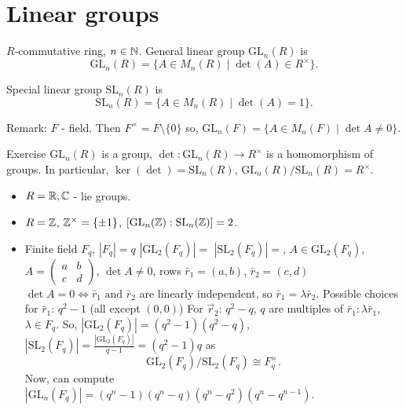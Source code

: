 \documentclass[10pt, a4paper]{article}
\begin{document}
\newpage

\section{Linear groups}

\begin{definition}
    $R$-commutative ring,
    $n \in \mathbb{N}$.
    General linear group $\mathrm{GL}_n(R)$ is
    \[
    \mathrm{GL}_n(R) = \{A \in M_n(R) \mid \det(A) \in R ^ {\times}\}.
    \]
\end{definition}

Special linear group $\mathrm{SL}_n(R)$ is
\[
\mathrm{SL}_n(R) = \{A \in M_n(R) \mid \det(A) = 1\}.
\]

Remark:
$F$ -
field.
Then $F ^ {\times} = F \setminus \{0\}$ so,
$\mathrm{GL}_n(F) = \{A \in M_n(F) \mid \det{A} \neq 0\}$.

Exercise $\mathrm{GL}_n(R)$ is a group,
$\det : \mathrm{GL}_n(R) \to R ^ {\times}$ is a homomorphism of groups.
In particular,
$\ker(\det) = \mathrm{SL}_n(R)$,
$\mathrm{GL}_n(R) / \mathrm{SL}_n(R) = R ^ {\times}$.

\begin{example}\phantom{}
    \begin{itemize}
        \item $R = \mathbb{R}, \mathbb{C}$ -
        lie groups.

        \item $R = \mathbb{Z}$,
        $\mathbb{Z} ^ {\times} = \{\pm 1\}$,
        $[\mathrm{GL}_n(\mathbb{Z}) : \mathrm{SL}_n(\mathbb{Z})] = 2$.

        \item Finite field $F_q$,
        $|F_q| = q$
        $|\mathrm{GL}_2(F_q)| = $
        $|\mathrm{SL}_2(F_q)| = $,
        $A \in \mathrm{GL}_2(F_q)$,
        $A = \begin{pmatrix}
            a & b \\ c & d
        \end{pmatrix}$,
        $\det{A} \neq 0$,
        rows $\bar{r}_1 = (a, b)$,
        $\bar{r}_2 = (c, d)$
        $\det{A} = 0 \iff \text{$\bar{r}_1$ and $\bar{r}_2$}$ are linearly independent,
        so $\bar{r}_1 = \lambda\bar{r}_2$.
        Possible choices for $\bar{r}_1$:
        $q ^ 2 - 1$
        (all except $(0, 0)$)
        For $\vec{r}_2$:
        $q ^ 2 - q$,
        $q$ are multiples of $\bar{r}_1: \lambda\bar{r}_1$,
        $\lambda \in F_q$.
        So,
        $|\mathrm{GL}_2(F_q)| = (q ^ 2 - 1)(q ^ 2 - q)$,
        $|\mathrm{SL}_2(F_q)| = \frac{|\mathrm{GL}_2(F_q)|}{q - 1} = (q ^ 2 - 1)q$ as
        \[
        \mathrm{GL}_2(F_q) / \mathrm{SL}_2(F_q) \cong F_q ^ {\times}.
        \]
        Now,
        can compute $|\mathrm{GL}_n(F_q)| = (q ^ n - 1)(q ^ n - q)(q ^ n - q ^ 2)(q ^ n - q ^ {n - 1})$.
        \end{itemize}
\end{example}
\end{document}
